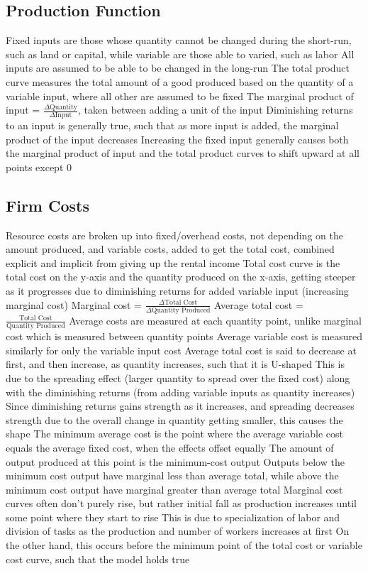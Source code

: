 \documentclass[11 pt, twoside]{article}
\newenvironment{outline*}
{
	\begin{outline}[enumerate]
	}
	{\end{outline}
}
\begin{document}
\subsection{Production Function}
\begin{outline*}
\1 Fixed inputs are those whose quantity cannot be changed during the short-run, such as land or capital, while variable are those able to varied, such as labor
\2 All inputs are assumed to be able to be changed in the long-run
\1 The total product curve measures the total amount of a good produced based on the quantity of a variable input, where all other are assumed to be fixed
\2 The marginal product of input = $\frac{\Delta \text{Quantity}}{\Delta \text{Input}}$, taken between adding a unit of the input
\2 Diminishing returns to an input is generally true, such that as more input is added, the marginal product of the input decreases
\1 Increasing the fixed input generally causes both the marginal product of input and the total product curves to shift upward at all points except 0
\end{outline*}
\subsection{Firm Costs}
\begin{outline*}
\1 Resource costs are broken up into fixed/overhead costs, not depending on the amount produced, and variable costs, added to get the total cost, combined explicit and implicit from giving up the rental income
\2 Total cost curve is the total cost on the y-axis and the quantity produced on the x-axis, getting steeper as it progresses due to diminishing returns for added variable input (increasing marginal cost)
\2 Marginal cost = $\frac{\Delta \text{Total Cost}}{\Delta \text{Quantity Produced}}$
\1 Average total cost = $\frac{\text{Total Cost}}{\text{Quantity Produced}}$
\2 Average costs are measured at each quantity point, unlike marginal cost which is measured between quantity points
\2 Average variable cost is measured similarly for only the variable input cost
\1 Average total cost is said to decrease at first, and then increase, as quantity increases, such that it is U-shaped
\2 This is due to the spreading effect (larger quantity to spread over the fixed cost) along with the diminishing returns (from adding variable inputs as quantity increases)
\3 Since diminishing returns gains strength as it increases, and spreading decreases strength due to the overall change in quantity getting smaller, this causes the shape
\2 The minimum average cost is the point where the average variable cost equals the average fixed cost, when the effects offset equally
\3 The amount of output produced at this point is the minimum-cost output
\3 Outputs below the minimum cost output have marginal less than average total, while above the minimum cost output have marginal greater than average total
\1 Marginal cost curves often don't purely rise, but rather initial fall as production increases until some point where they start to rise
\2 This is due to specialization of labor and division of tasks as the production and number of workers increases at first
\2 On the other hand, this occurs before the minimum point of the total cost or variable cost curve, such that the model holds true
\end{outline*}
\end{document}
